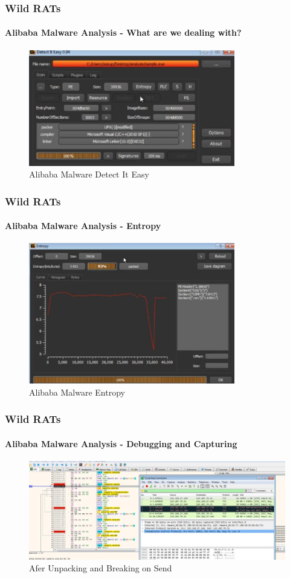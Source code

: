 \documentclass[aspectratio=169]{beamer}
\begin{document}
\begin{frame}
  \frametitle{Wild RATs}
  \framesubtitle{Alibaba Malware Analysis - What are we dealing with?}
  \begin{center}
    \begin{figure}
      \includegraphics[width=9cm,keepaspectratio]{alibaba_die_main}
      \caption{Alibaba Malware Detect It Easy}
    \end{figure}
  \end{center}
\end{frame}

\begin{frame}
  \frametitle{Wild RATs}
  \framesubtitle{Alibaba Malware Analysis - Entropy}
  \begin{center}
    \begin{figure}
      \includegraphics[width=9cm,keepaspectratio]{alibaba_die_entropy}
      \caption{Alibaba Malware Entropy}
    \end{figure}
  \end{center}
\end{frame}

\begin{frame}
  \frametitle{Wild RATs}
  \framesubtitle{Alibaba Malware Analysis - Debugging and Capturing}
  \begin{center}
    \begin{figure}
      \includegraphics[width=14cm,keepaspectratio]{alibaba_cnc}
      \caption{Afer Unpacking and Breaking on Send}
    \end{figure}
  \end{center}
\end{frame}
\end{document}
